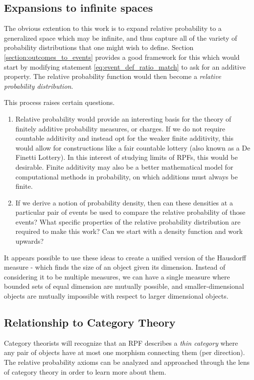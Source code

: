 \documentclass[twoside]{article}
\theoremstyle{plain}%
\theoremstyle{definition}
\theoremstyle{remark}
\begin{document}
\subsection{Expansions to infinite spaces}
The obvious extention to this work is to expand relative probability to a generalized space which may be infinite, and thus capture all of the variety of probability distributions that one might wish to define. Section \ref{section:outcomes_to_events} provides a good framework for this which would start by modifying statement \ref{eq:event_def_ratio_match} to ask for an additive property. The relative probability function would then become a \textit{relative probability distribution}.

This process raises certain questions.
\begin{enumerate}
\item Relative probability would provide an interesting basis for the theory of finitely additive probability measures, or charges\cite{charges}. If we do not require countable additivity and instead opt for the weaker finite additivity, this would allow for constructions like a fair countable lottery (also known as a De Finetti Lottery\cite{de_finetti}). In this interest of studying limits of RPFs, this would be desirable. Finite additivity may also be a better mathematical model for computational methods in probability, on which additions must always be finite.
\item If we derive a notion of probability density, then can these densities at a particular pair of events be used to compare the relative probability of those events? What specific properties of the relative probability distribution are required to make this work? Can we start with a density function and work upwards?
\end{enumerate}

It appears possible to use these ideas to create a unified version of the Hausdorff measure - which finds the size of an object given its dimension. Instead of considering it to be multiple measures, we can have a single measure where bounded sets of equal dimension are mutually possible, and smaller-dimensional objects are mutually impossible with respect to larger dimensional objects.

\subsection{Relationship to Category Theory}

Category theorists will recognize that an RPF describes a \textit{thin category} where any pair of objects have at most one morphism connecting them (per direction). The relative probability axioms can be analyzed and approached through the lens of category theory in order to learn more about them.
\end{document}
